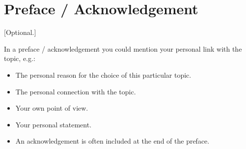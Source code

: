 \documentclass[./\jobname.tex]{subfiles}
\begin{document}
\chapter*{Preface / Acknowledgement}
[Optional.]\par
%
In a preface / acknowledgement you could mention your personal link with the topic, e.g.:
\begin{itemize}
	\item  The personal reason for the choice of this  particular topic.
	\item The personal connection with the topic.
	\item Your own point of view.
	\item Your personal statement.
	\item An acknowledgement is often included at the  end of the preface.
\end{itemize}
%
\end{document}
